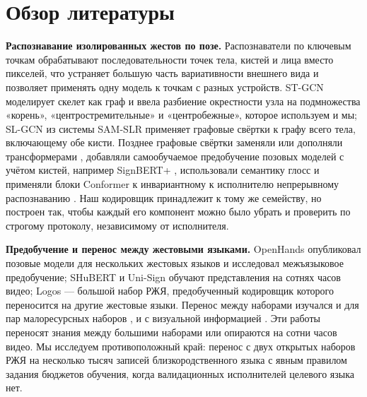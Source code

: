 \documentclass[a4paper,fleqn]{cas-dc}
\begin{document}
\hypertarget{ux43eux431ux437ux43eux440-ux43bux438ux442ux435ux440ux430ux442ux443ux440ux44b}{%
\section{Обзор литературы}\label{ux43eux431ux437ux43eux440-ux43bux438ux442ux435ux440ux430ux442ux443ux440ux44b}}

\textbf{Распознавание изолированных жестов по позе.} Распознаватели по ключевым точкам обрабатывают последовательности точек тела, кистей и лица вместо пикселей, что устраняет большую часть вариативности внешнего вида и позволяет применять одну модель к точкам с разных устройств. ST-GCN \cite{2018_yan_stgcn} моделирует скелет как граф и ввела разбиение окрестности узла на подмножества «корень», «центростремительные» и «центробежные», которое используем и мы; SL-GCN из системы SAM-SLR \cite{2021_jiang_sam_slr} применяет графовые свёртки к графу всего тела, включающему обе кисти. Позднее графовые свёртки заменяли или дополняли трансформерами \cite{2017_vaswani_attention}, добавляли самообучаемое предобучение позовых моделей с учётом кистей, например SignBERT+ \cite{2023_hu_signbert_plus}, использовали семантику глосс \cite{2023_zuo_nla_slr} и применяли блоки Conformer \cite{2020_gulati_conformer} к инвариантному к исполнителю непрерывному распознаванию \cite{2025_isharah_signer_invariant_conformer}. Наш кодировщик принадлежит к тому же семейству, но построен так, чтобы каждый его компонент можно было убрать и проверить по строгому протоколу, независимому от исполнителя.

\textbf{Предобучение и перенос между жестовыми языками.} OpenHands \cite{2022_selvaraj_openhands} опубликовал позовые модели для нескольких жестовых языков и исследовал межъязыковое предобучение; SHuBERT \cite{2025_gueuwou_shubert} и Uni-Sign \cite{2025_li_uni_sign} обучают представления на сотнях часов видео; Logos \cite{2025_ovodov_logos} --- большой набор РЖЯ, предобученный кодировщик которого переносится на другие жестовые языки. Перенос между наборами изучался и для пар малоресурсных наборов \cite{2024_kindiroglu_cross_dataset_transfer}, и с визуальной информацией \cite{2023_ryumin_cross_language_transfer}. Эти работы переносят знания между большими наборами или опираются на сотни часов видео. Мы исследуем противоположный край: перенос с двух открытых наборов РЖЯ на несколько тысяч записей близкородственного языка с явным правилом задания бюджетов обучения, когда валидационных исполнителей целевого языка нет.
\end{document}
